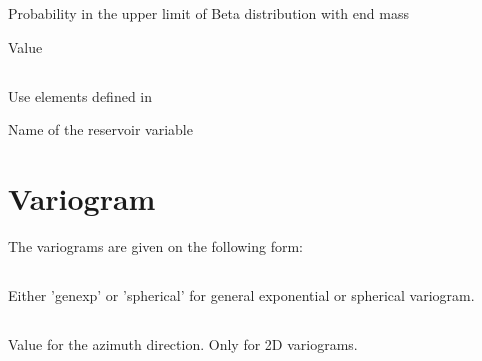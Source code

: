 {\subsubsection{}
 \slist
   \item \Description Probability in the upper limit of Beta distribution with end mass
   \item \Argument Value
   \item \Default
 \elist

\subsection{}
 \slist
   \item \Description Use elements defined in 
   \item \Argument Name of the reservoir variable
   \item \Default
 \elist

\section{Variogram}
\label{sec:variogram}
  The variograms are given on the following form:

\subsection{}
 \slist
   \item \Description Either 'genexp' or 'spherical' for general exponential or spherical variogram.
   \item \Argument
   \item \Default
 \elist

\subsection{}
 \slist
   \item \Description Value for the azimuth direction. Only for 2D variograms.
   \item \Argument
   \item \Default
 \elist

}
